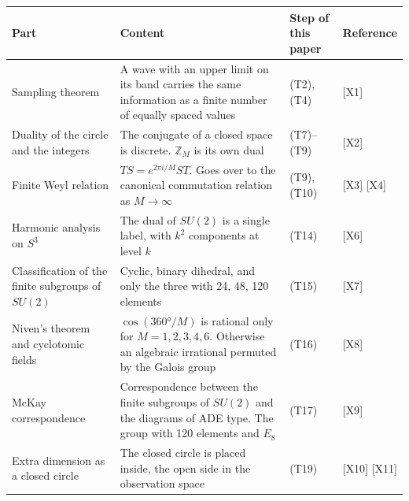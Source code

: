 \documentclass[
  a4paper,
]{article}
\newcounter{none} %
\begin{document}
{\def\LTcaptype{none} %
\begin{longtable}[]{@{}
  >{\raggedright\arraybackslash}p{}
  >{\raggedright\arraybackslash}p{}
  >{\raggedright\arraybackslash}p{}
  >{\raggedright\arraybackslash}p{}@{}}
\toprule\noalign{}
\begin{minipage}[b]{\linewidth}\raggedright
Part
\end{minipage} & \begin{minipage}[b]{\linewidth}\raggedright
Content
\end{minipage} & \begin{minipage}[b]{\linewidth}\raggedright
Step of this paper
\end{minipage} & \begin{minipage}[b]{\linewidth}\raggedright
Reference
\end{minipage} \\
\midrule\noalign{}
\endhead
\bottomrule\noalign{}
\endlastfoot
Sampling theorem & A wave with an upper limit on its band carries the
same information as a finite number of equally spaced values & (T2),
(T4) & {[}X1{]} \\
Duality of the circle and the integers & The conjugate of a closed space
is discrete. \(\mathbb{Z}_M\) is its own dual & (T7)--(T9) & {[}X2{]} \\
Finite Weyl relation & \(TS=e^{2\pi i/M}ST\). Goes over to the canonical
commutation relation as \(M\to\infty\) & (T9), (T10) & {[}X3{]}
{[}X4{]} \\
Harmonic analysis on \(S^3\) & The dual of \(SU(2)\) is a single label,
with \(k^2\) components at level \(k\) & (T14) & {[}X6{]} \\
Classification of the finite subgroups of \(SU(2)\) & Cyclic, binary
dihedral, and only the three with 24, 48, 120 elements & (T15) &
{[}X7{]} \\
Niven's theorem and cyclotomic fields & \(\cos(360°/M)\) is rational
only for \(M=1,2,3,4,6\). Otherwise an algebraic irrational permuted by
the Galois group & (T16) & {[}X8{]} \\
McKay correspondence & Correspondence between the finite subgroups of
\(SU(2)\) and the diagrams of ADE type. The group with 120 elements and
\(E_8\) & (T17) & {[}X9{]} \\
Extra dimension as a closed circle & The closed circle is placed inside,
the open side in the observation space & (T19) & {[}X10{]} {[}X11{]} \\
\end{longtable}
}
\end{document}
